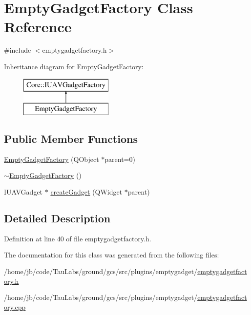 \hypertarget{class_empty_gadget_factory}{\section{\-Empty\-Gadget\-Factory \-Class \-Reference}
\label{class_empty_gadget_factory}
}


{\ttfamily \#include $<$emptygadgetfactory.\-h$>$}

\-Inheritance diagram for \-Empty\-Gadget\-Factory\-:\begin{figure}[H]
\begin{center}
\leavevmode
\includegraphics[height=2.000000cm]{class_empty_gadget_factory}
\end{center}
\end{figure}
\subsection*{\-Public \-Member \-Functions}
\begin{DoxyCompactItemize}
\item 
\hyperlink{group___empty_gadget_plugin_gaf98a291f00c46f8dfde8d7c9d6f8fb6c}{\-Empty\-Gadget\-Factory} (\-Q\-Object $\ast$parent=0)
\item 
\hyperlink{group___empty_gadget_plugin_gabec68115923f555ddd7cc38ba7a3ee80}{$\sim$\-Empty\-Gadget\-Factory} ()
\item 
\-I\-U\-A\-V\-Gadget $\ast$ \hyperlink{group___empty_gadget_plugin_gaf091c2a41b028c469236b6ad70d4addf}{create\-Gadget} (\-Q\-Widget $\ast$parent)
\end{DoxyCompactItemize}


\subsection{\-Detailed \-Description}


\-Definition at line 40 of file emptygadgetfactory.\-h.



\-The documentation for this class was generated from the following files\-:\begin{DoxyCompactItemize}
\item 
/home/jb/code/\-Tau\-Labs/ground/gcs/src/plugins/emptygadget/\hyperlink{emptygadgetfactory_8h}{emptygadgetfactory.\-h}\item 
/home/jb/code/\-Tau\-Labs/ground/gcs/src/plugins/emptygadget/\hyperlink{emptygadgetfactory_8cpp}{emptygadgetfactory.\-cpp}\end{DoxyCompactItemize}
